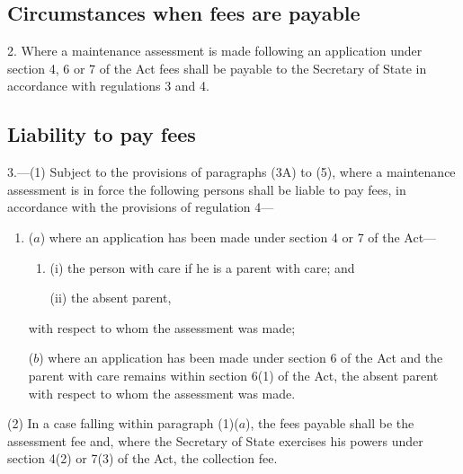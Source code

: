 \documentclass[12pt,a4paper]{article}
\begin{document}

\subsection[2. Circumstances when fees are payable]{Circumstances when fees are payable}

2.  Where a maintenance assessment is made following an application under section 4, 6 or 7 of the Act fees shall be payable to the Secretary of State in accordance with regulations 3 and 4.

\subsection[3. Liability to pay fees]{Liability to pay fees}

3.—(1) Subject to the provisions of 
paragraphs (3A) to (5),  %
where a maintenance assessment is in force the following persons shall be liable to pay fees, in accordance with the provisions of regulation 4—
\begin{enumerate}\item[]
($a$) where an application has been made under section 4 or 7 of the Act—
\begin{enumerate}\item[]
(i) the person with care if he is a parent with care; and

(ii) the absent parent,
\end{enumerate}
with respect to whom the assessment was made;

($b$) where an application has been made under section 6 of the Act and the parent with care remains within section 6(1) of the Act, the absent parent with respect to whom the assessment was made.
\end{enumerate}

(2) In a case falling within paragraph (1)($a$), the fees payable shall be the assessment fee and, where the Secretary of State exercises his powers under section 4(2) or 7(3) of the Act, the collection fee.
\end{document}
